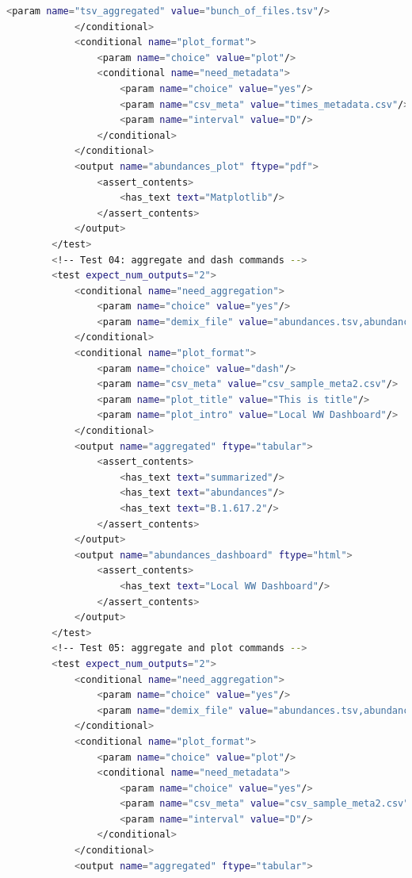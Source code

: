 \begin{lstlisting}[language=bash, caption=tool wrapper for Freyja: Aggregate and visualize demixed results, label=list:methods:wrapper-freyja-agg]
                <param name="tsv_aggregated" value="bunch_of_files.tsv"/>
            </conditional>
            <conditional name="plot_format">
                <param name="choice" value="plot"/>
                <conditional name="need_metadata">
                    <param name="choice" value="yes"/>
                    <param name="csv_meta" value="times_metadata.csv"/>
                    <param name="interval" value="D"/>
                </conditional>
            </conditional>
            <output name="abundances_plot" ftype="pdf">
                <assert_contents>
                    <has_text text="Matplotlib"/>
                </assert_contents>
            </output>
        </test>
        <!-- Test 04: aggregate and dash commands -->
        <test expect_num_outputs="2">
            <conditional name="need_aggregation">
                <param name="choice" value="yes"/>
                <param name="demix_file" value="abundances.tsv,abundances2.tsv,abundances3.tsv"/>
            </conditional>
            <conditional name="plot_format">
                <param name="choice" value="dash"/>
                <param name="csv_meta" value="csv_sample_meta2.csv"/>
                <param name="plot_title" value="This is title"/>
                <param name="plot_intro" value="Local WW Dashboard"/>
            </conditional>
            <output name="aggregated" ftype="tabular">
                <assert_contents>
                    <has_text text="summarized"/>
                    <has_text text="abundances"/>
                    <has_text text="B.1.617.2"/>
                </assert_contents>
            </output>
            <output name="abundances_dashboard" ftype="html">
                <assert_contents>
                    <has_text text="Local WW Dashboard"/>
                </assert_contents>
            </output>
        </test>
        <!-- Test 05: aggregate and plot commands -->
        <test expect_num_outputs="2">
            <conditional name="need_aggregation">
                <param name="choice" value="yes"/>
                <param name="demix_file" value="abundances.tsv,abundances2.tsv,abundances3.tsv"/>
            </conditional>
            <conditional name="plot_format">
                <param name="choice" value="plot"/>
                <conditional name="need_metadata">
                    <param name="choice" value="yes"/>
                    <param name="csv_meta" value="csv_sample_meta2.csv"/>
                    <param name="interval" value="D"/>
                </conditional>
            </conditional>
            <output name="aggregated" ftype="tabular">

\end{lstlisting}
